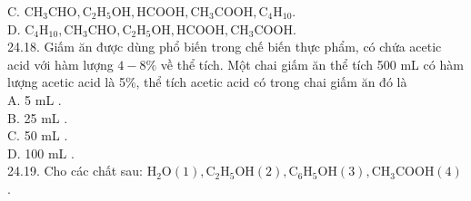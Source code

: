 \documentclass[10pt]{article}
\begin{document}
C. $\mathrm{CH}_{3} \mathrm{CHO}, \mathrm{C}_{2} \mathrm{H}_{5} \mathrm{OH}, \mathrm{HCOOH}, \mathrm{CH}_{3} \mathrm{COOH}, \mathrm{C}_{4} \mathrm{H}_{10}$.\\
D. $\mathrm{C}_{4} \mathrm{H}_{10}, \mathrm{CH}_{3} \mathrm{CHO}, \mathrm{C}_{2} \mathrm{H}_{5} \mathrm{OH}, \mathrm{HCOOH}, \mathrm{CH}_{3} \mathrm{COOH}$.\\
24.18. Giấm ăn được dùng phổ biến trong chế biến thực phẩm, có chứa acetic acid với hàm lượng $4-8 \%$ về thể tích. Một chai giấm ăn thể tích 500 mL có hàm lượng acetic acid là 5\%, thể tích acetic acid có trong chai giấm ăn đó là\\
A. 5 mL .\\
B. 25 mL .\\
C. 50 mL .\\
D. 100 mL .\\
24.19. Cho các chất sau: $\mathrm{H}_{2} \mathrm{O}(1), \mathrm{C}_{2} \mathrm{H}_{5} \mathrm{OH}(2), \mathrm{C}_{6} \mathrm{H}_{5} \mathrm{OH}(3), \mathrm{CH}_{3} \mathrm{COOH}(4)$.
\end{document}
